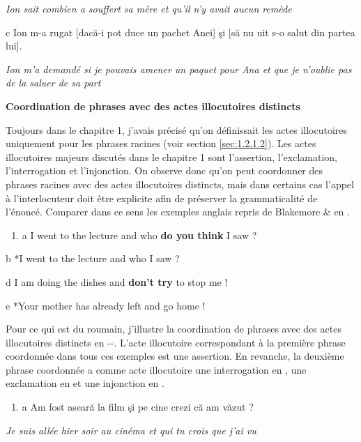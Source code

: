 {\itshape
Ion sait combien a souffert sa mère et qu'il n'y avait aucun remède}

  c  Ion m-a rugat [dacă-i pot duce un pachet Anei] şi [să nu uit s-o salut din partea lui]. 

\textit{Ion m'a demandé si je pouvais amener un paquet pour Ana et que je n'oublie pas de la saluer de sa part }  

{\bfseries
Coordination de phrases avec des actes illocutoires distincts}

Toujours dans le chapitre 1, j'avais précisé qu'on définissait les actes illocutoires uniquement pour les phrases racines (voir section \ref{sec:1.2.1.2}). Les actes illocutoires majeurs discutés dans le chapitre 1 sont l'assertion, l'exclamation, l'interrogation et l'injonction. On observe donc qu'on peut coordonner des phrases racines avec des actes illocutoires distincts, mais dans certains cas l'appel à l'interlocuteur doit être explicite afin de préserver la grammaticalité de l'énoncé. Comparer dans ce sens les exemples anglais repris de Blakemore \& \citet[588]{Carston2005} en .


\begin{enumerate}
\item \label{bkm:Ref300782480}a  I went to the lecture and who \textbf{do you think} I saw ?


\end{enumerate}
  b  *I went to the lecture and who I saw ?

  d  I am doing the dishes and \textbf{don't try} to stop me ! 

  e  *Your mother has already left and go home !

Pour ce qui est du roumain, j'illustre la coordination de phrases avec des actes illocutoires distincts en --. L'acte illocutoire correspondant à la première phrase coordonnée dans tous ces exemples est une assertion. En revanche, la deuxième phrase coordonnée a comme acte illocutoire une interrogation en , une exclamation en  et une injonction en .  


\begin{enumerate}
\item \label{bkm:Ref300783484}a  Am fost aseară la film şi pe cine crezi că am văzut ? 


\end{enumerate}
{\itshape
Je suis allée hier soir au cinéma et qui tu crois que j'ai vu}

